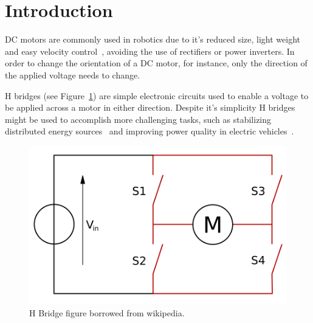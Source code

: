 \section{\textbf{Introduction}}\label{sec:1}
	DC motors are commonly used in robotics due to it's reduced size, light weight and easy velocity control~\cite{CHAPMAN}, avoiding the use of rectifiers or power inverters. In order to change the orientation of a DC motor, for instance, only the direction of the applied voltage needs to change.

	H bridges (see Figure~\ref{fig:bridge}) are simple electronic circuits used to enable a voltage to be applied across a motor in either direction. Despite it's simplicity H bridges might be used to accomplish more challenging tasks, such as stabilizing distributed energy sources~\cite{H-POWER-QUALITY} and improving power quality in electric vehicles~\cite{H-FILTERING}.

\begin{figure}[h]
    \centering
    \centering%
    \includegraphics[height=.25\textwidth]{img/H_bridge.png}
    \caption[caption H Bridge]{H Bridge figure borrowed from wikipedia\protect\footnotemark.}
    \label{fig:bridge}%
\end{figure}

